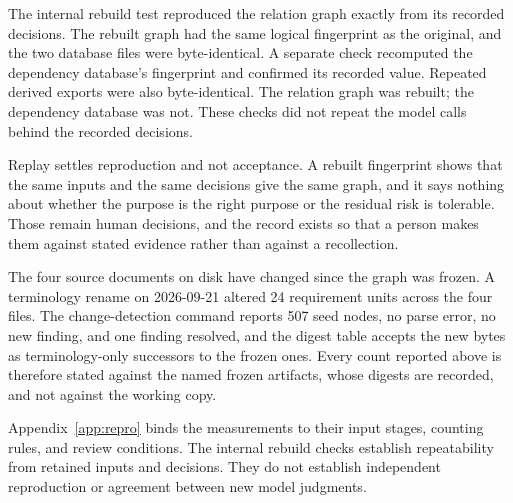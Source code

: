 The internal rebuild test reproduced the relation graph exactly from its recorded decisions. The rebuilt graph had the same logical fingerprint as the original, and the two database files were byte-identical. A separate check recomputed the dependency database's fingerprint and confirmed its recorded value. Repeated derived exports were also byte-identical. The relation graph was rebuilt; the dependency database was not. These checks did not repeat the model calls behind the recorded decisions.

Replay settles reproduction and not acceptance. A rebuilt fingerprint shows that the same inputs and the same decisions give the same graph, and it says nothing about whether the purpose is the right purpose or the residual risk is tolerable. Those remain human decisions, and the record exists so that a person makes them against stated evidence rather than against a recollection.

The four source documents on disk have changed since the graph was frozen. A terminology rename on 2026-09-21 altered 24 requirement units across the four files. The change-detection command reports 507 seed nodes, no parse error, no new finding, and one finding resolved, and the digest table accepts the new bytes as terminology-only successors to the frozen ones. Every count reported above is therefore stated against the named frozen artifacts, whose digests are recorded, and not against the working copy.

Appendix~\ref{app:repro} binds the measurements to their input stages, counting rules, and review conditions. The internal rebuild checks establish repeatability from retained inputs and decisions. They do not establish independent reproduction or agreement between new model judgments.
